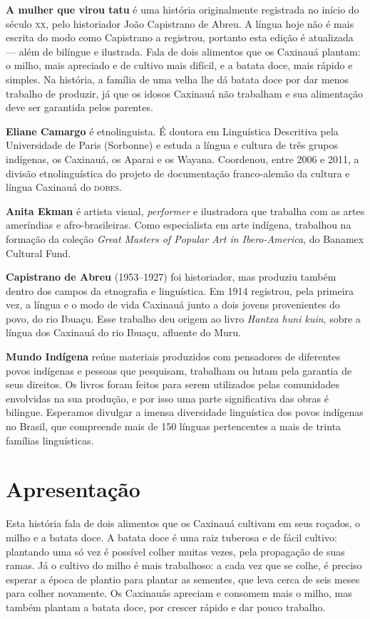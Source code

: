 \textbf{A mulher que virou tatu} é uma história originalmente registrada no início do século \textsc{xx}, pelo historiador João Capistrano de Abreu. A língua hoje não é mais escrita do modo como Capistrano a registrou, portanto esta edição é atualizada --- além de bilíngue e ilustrada. Fala de dois alimentos que os Caxinauá plantam: o milho, mais apreciado e de cultivo mais difícil, e a batata doce, mais rápido e simples. Na história, a família de uma velha lhe dá batata doce por dar menos trabalho de produzir, já que os idosos Caxinauá não trabalham e sua alimentação deve ser garantida pelos parentes.

\textbf{Eliane Camargo} é etnolinguista. É doutora em Linguística Descritiva pela Universidade de Paris (Sorbonne) e estuda a língua e cultura de três grupos indígenas, os Caxinauá, os Aparai e os Wayana. Coordenou, entre 2006 e 2011, a divisão etnolinguística do projeto de documentação franco-alemão da cultura e língua Caxinauá do \textsc{dobes}.

\textbf{Anita Ekman} é artista visual, \textit{performer} e ilustradora que trabalha com as artes ameríndias e afro-brasileiras. Como especialista em arte indígena, trabalhou na formação da coleção \textit{Great Masters of Popular Art in Ibero-America}, do Banamex Cultural Fund.

\textbf{Capistrano de Abreu} (1953--1927) foi historiador, mas produziu também dentro dos campos da etnografia e linguística. Em 1914 registrou, pela primeira vez, a língua e o modo de vida Caxinauá junto a dois jovens provenientes do povo, do rio Ibuaçu. Esse trabalho deu origem ao livro \textit{Hantxa huni kuin}, sobre a língua dos Caxinauá do rio Ibuaçu, afluente do Muru.

\textbf{Mundo Indígena} reúne materiais produzidos com pensadores de diferentes povos indígenas e pessoas que pesquisam, trabalham ou lutam pela garantia de seus direitos. Os livros foram feitos para serem utilizados pelas comunidades envolvidas na sua produção, e por isso uma parte significativa das obras é bilíngue. Esperamos divulgar a imensa diversidade linguística dos povos indígenas no Brasil, que compreende mais de 150 línguas pertencentes a mais de trinta famílias linguísticas.


\chapter{Apresentação}

Esta história fala de dois alimentos que os Caxinauá cultivam em seus roçados, o milho e a batata doce. A batata doce é uma raiz tuberosa e de fácil cultivo: plantando uma só vez é possível colher muitas vezes, pela propagação de suas ramas. Já o cultivo do milho é mais trabalhoso: a cada vez que se colhe, é preciso esperar a época de plantio para plantar as sementes, que leva cerca de seis meses para colher novamente. Os Caxinauás apreciam e consomem mais o milho, mas também plantam a batata doce, por crescer rápido e dar pouco trabalho.


